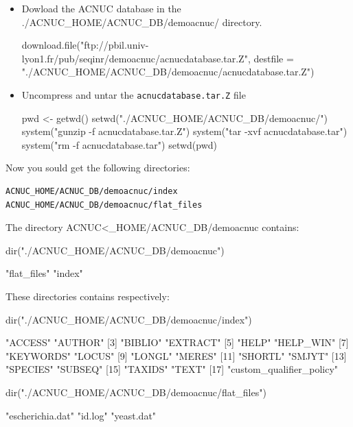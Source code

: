 \documentclass{article}
\begin{document}
\begin{itemize}
\item Dowload the ACNUC database in the ./ACNUC\_HOME/ACNUC\_DB/demoacnuc/ directory.

\begin{Schunk}
\begin{Sinput}
 download.file("ftp://pbil.univ-lyon1.fr/pub/seqinr/demoacnuc/acnucdatabase.tar.Z", 
     destfile = "./ACNUC_HOME/ACNUC_DB/demoacnuc/acnucdatabase.tar.Z")
\end{Sinput}
\end{Schunk}


\item Uncompress and untar the \texttt{acnucdatabase.tar.Z} file 

\begin{Schunk}
\begin{Sinput}
 pwd <- getwd()
 setwd("./ACNUC_HOME/ACNUC_DB/demoacnuc/")
 system("gunzip -f acnucdatabase.tar.Z")
 system("tar -xvf acnucdatabase.tar")
 system("rm -f acnucdatabase.tar")
 setwd(pwd)
\end{Sinput}
\end{Schunk}

\end{itemize}
Now you sould get the following directories:
\begin{verbatim}
ACNUC_HOME/ACNUC_DB/demoacnuc/index
ACNUC_HOME/ACNUC_DB/demoacnuc/flat_files
\end{verbatim}

The directory ACNUC<\_HOME/ACNUC\_DB/demoacnuc contains: 
\begin{Schunk}
\begin{Sinput}
 dir("./ACNUC_HOME/ACNUC_DB/demoacnuc")
\end{Sinput}
\begin{Soutput}
[1] "flat_files" "index"     
\end{Soutput}
\end{Schunk}
These directories  contains respectively:


\begin{Schunk}
\begin{Sinput}
 dir("./ACNUC_HOME/ACNUC_DB/demoacnuc/index")
\end{Sinput}
\begin{Soutput}
 [1] "ACCESS"                  "AUTHOR"                 
 [3] "BIBLIO"                  "EXTRACT"                
 [5] "HELP"                    "HELP_WIN"               
 [7] "KEYWORDS"                "LOCUS"                  
 [9] "LONGL"                   "MERES"                  
[11] "SHORTL"                  "SMJYT"                  
[13] "SPECIES"                 "SUBSEQ"                 
[15] "TAXIDS"                  "TEXT"                   
[17] "custom_qualifier_policy"
\end{Soutput}
\begin{Sinput}
 dir("./ACNUC_HOME/ACNUC_DB/demoacnuc/flat_files")
\end{Sinput}
\begin{Soutput}
[1] "escherichia.dat" "id.log"          "yeast.dat"      
\end{Soutput}
\end{Schunk}
\end{document}
